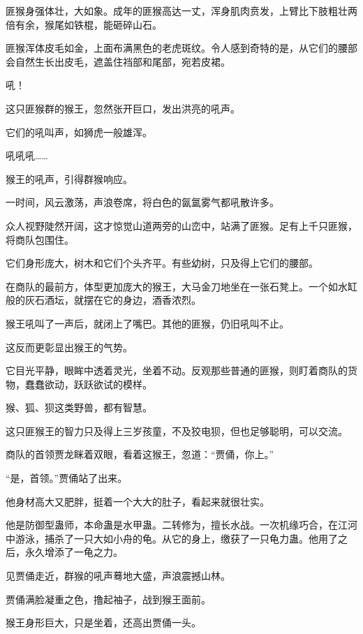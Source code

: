 
\begin{this_body}



匪猴身强体壮，大如象。成年的匪猴高达一丈，浑身肌肉贲发，上臂比下肢粗壮两倍有余，猴尾如铁棍，能砸碎山石。

匪猴浑体皮毛如金，上面布满黑色的老虎斑纹。令人感到奇特的是，从它们的腰部会自然生长出皮毛，遮盖住裆部和尾部，宛若皮裙。

吼！

这只匪猴群的猴王，忽然张开巨口，发出洪亮的吼声。

它们的吼叫声，如狮虎一般雄浑。

吼吼吼……

猴王的吼声，引得群猴响应。

一时间，风云激荡，声浪卷席，将白色的氤氲雾气都吼散许多。

众人视野陡然开阔，这才惊觉山道两旁的山峦中，站满了匪猴。足有上千只匪猴，将商队包围住。

它们身形庞大，树木和它们个头齐平。有些幼树，只及得上它们的腰部。

在商队的最前方，体型更加庞大的猴王，大马金刀地坐在一张石凳上。一个如水缸般的灰石酒坛，就摆在它的身边，酒香浓烈。

猴王吼叫了一声后，就闭上了嘴巴。其他的匪猴，仍旧吼叫不止。

这反而更彰显出猴王的气势。

它目光平静，眼眸中透着灵光，坐着不动。反观那些普通的匪猴，则盯着商队的货物，蠢蠢欲动，跃跃欲试的模样。

猴、狐、狈这类野兽，都有智慧。

这只匪猴王的智力只及得上三岁孩童，不及狡电狈，但也足够聪明，可以交流。

商队的首领贾龙眯着双眼，看着这猴王，忽道：“贾俑，你上。”

“是，首领。”贾俑站了出来。

他身材高大又肥胖，挺着一个大大的肚子，看起来就很壮实。

他是防御型蛊师，本命蛊是水甲蛊。二转修为，擅长水战。一次机缘巧合，在江河中游泳，捕杀了一只大如小舟的龟。从它的身上，缴获了一只龟力蛊。他用了之后，永久增添了一龟之力。

见贾俑走近，群猴的吼声蓦地大盛，声浪震撼山林。

贾俑满脸凝重之色，撸起袖子，战到猴王面前。

猴王身形巨大，只是坐着，还高出贾俑一头。


\end{this_body}
